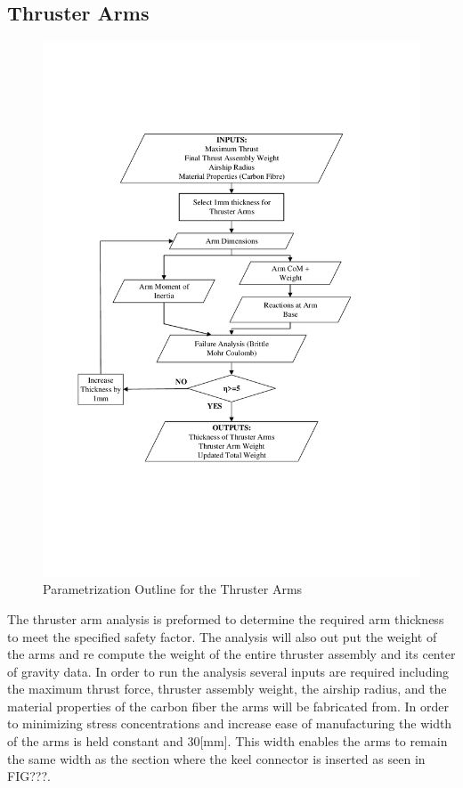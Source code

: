 \documentclass[../main.tex]{subfiles}
\begin{document}
\subsection{Thruster Arms} \label{thrustArms}

\begin{figure}[H]
	\centering
	\includegraphics[width=.9\linewidth]{img/paramaterization/thrusterArms.pdf}
	\caption{Parametrization Outline for the Thruster Arms}
	\label{fig:thrusterArmsParametrization}
\end{figure}

The thruster arm analysis is preformed to determine the required arm thickness to meet the specified safety factor. The analysis will also out put the weight of the arms and re compute the weight of the entire thruster assembly and its center of gravity data. In order to run the analysis several inputs are required including the maximum thrust force, thruster assembly weight, the airship radius, and the material properties of the carbon fiber the arms will be fabricated from. In order to minimizing stress concentrations and increase ease of manufacturing the width of the arms is held constant and 30[mm]. This width enables the arms to remain the same width as the section where the keel connector is inserted as seen in FIG???. \\
\end{document}
